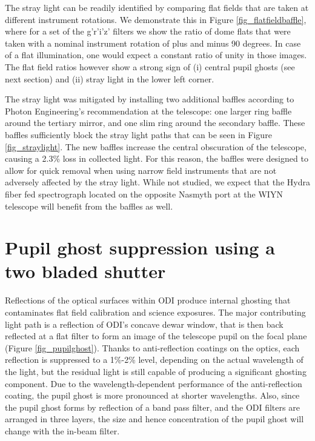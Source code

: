 \documentclass[]{spieman}
\begin{document}
The stray light  can be readily identified by comparing flat fields that are
taken at different instrument rotations. We demonstrate this in Figure
\ref{fig_flatfieldbaffle}, where for a set of the g'r'i'z' filters we show the
ratio of dome flats that were taken with a nominal instrument rotation of plus
and minus 90 degrees.  In case of a flat illumination, one would expect a
constant ratio of unity in those images. The flat field ratios however show a
strong sign of (i) central pupil ghosts (see next section) and (ii) stray light
in the lower left corner.

The stray light was mitigated by installing two additional baffles according to
Photon Engineering's recommendation  at the telescope: one larger ring baffle
around the tertiary mirror, and one slim ring around the secondary baffle. These
baffles sufficiently block the stray light paths that can be seen in Figure
\ref{fig_straylight}. The new baffles increase the central obscuration of the
telescope, causing a 2.3\% loss in collected light. For this reason, the baffles
were designed to allow for quick removal when using narrow field instruments
that are not adversely affected by the stray light. While not studied, we expect
that the Hydra fiber fed spectrograph located on the opposite Nasmyth port at
the WIYN telescope will benefit from the baffles as well.


\section{Pupil ghost suppression using a two bladed shutter}
\label{sect_ghost}

Reflections of the optical surfaces within ODI produce internal ghosting that
contaminates flat field calibration and science exposures. The major
contributing light path is a reflection of ODI’s concave dewar window, that is
then back reflected at a flat filter to form an image of the telescope pupil on
the focal plane (Figure \ref{fig_pupilghost}).  Thanks to anti-reflection
coatings on the optics, each reflection is suppressed to a 1\%-2\% level,
depending on the actual wavelength of the light, but the residual light is still
capable of producing a significant ghosting component. Due to the
wavelength-dependent performance of the anti-reflection coating, the pupil ghost
is more pronounced at shorter wavelengths. Also, since the pupil ghost forms by
reflection of a band pass filter, and the ODI filters are arranged in three
layers, the size and hence concentration of the pupil ghost will change with the
in-beam filter.
\end{document}

